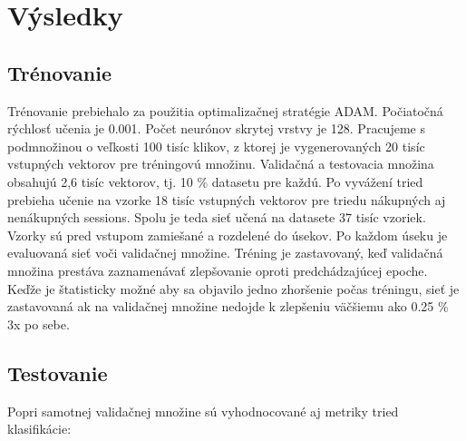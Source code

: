 \newpage

\chapter{Výsledky}

\section{Trénovanie}

Trénovanie prebiehalo za použitia optimalizačnej stratégie ADAM. Počiatočná rýchlosť učenia je 0.001. Počet neurónov skrytej vrstvy je 128.\newline
Pracujeme s podmnožinou o veľkosti 100 tisíc klikov, z ktorej je vygenerovaných 20 tisíc vstupných vektorov pre tréningovú množinu. Validačná a testovacia množina obsahujú 2,6 tisíc vektorov, tj. 10 \% datasetu pre každú. Po vyvážení tried prebieha učenie na vzorke 18 tisíc vstupných vektorov pre triedu nákupných aj nenákupných sessions. Spolu je teda sieť učená na datasete 37 tisíc vzoriek. Vzorky sú pred vstupom zamiešané a rozdelené do úsekov. Po každom úseku je evaluovaná sieť voči validačnej množine.\newline
Tréning je zastavovaný, keď validačná množina prestáva zaznamenávať zlepšovanie oproti predchádzajúcej epoche. Keďže je štatisticky možné aby sa objavilo jedno zhoršenie počas tréningu, sieť je zastavovaná ak na validačnej množine nedojde k zlepšeniu väčšiemu ako 0.25 \% 3x po sebe. 

\section{Testovanie}
\label{testing}

Popri samotnej validačnej množine sú vyhodnocované aj metriky tried klasifikácie:

\begin{my_itemize}
\end{my_itemize}

